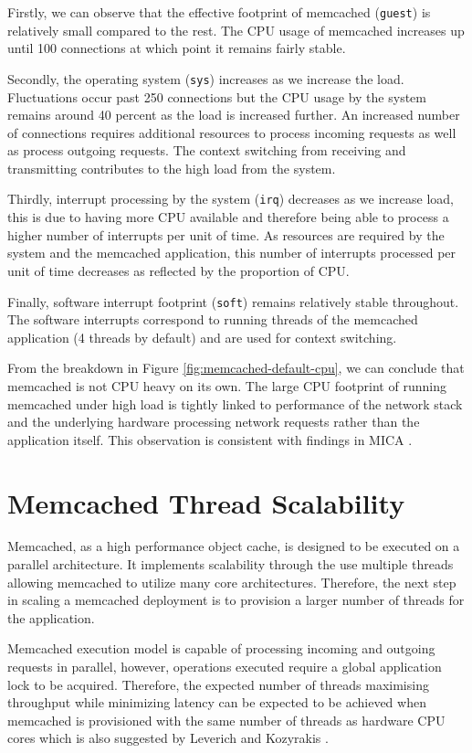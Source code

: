 Firstly, we can observe that the effective footprint of memcached (\texttt{guest}) is relatively small compared to the rest. The CPU usage of memcached increases up until 100 connections at which point it remains fairly stable.

Secondly, the operating system (\texttt{sys}) increases as we increase the load. Fluctuations occur past 250 connections but the CPU usage by the system remains around 40 percent as the load is increased further. An increased number of connections requires additional resources to process incoming requests as well as process outgoing requests. The context switching from receiving and transmitting contributes to the high load from the system.

Thirdly, interrupt processing by the system (\texttt{irq}) decreases as we increase load, this is due to having more CPU available and therefore being able to process a higher number of interrupts per unit of time. As resources are required by the system and the memcached application, this number of interrupts processed per unit of time decreases as reflected by the proportion of CPU.

Finally, software interrupt footprint (\texttt{soft}) remains relatively stable throughout. The software interrupts correspond to running threads of the memcached application (4 threads by default) and are used for context switching.

From the breakdown in Figure \ref{fig:memcached-default-cpu}, we can conclude that memcached is not CPU heavy on its own. The large CPU footprint of running memcached under high load is tightly linked to performance of the network stack and the underlying hardware processing network requests rather than the application itself. This observation is consistent with findings in MICA \cite{lim2014mica}.


\section{Memcached Thread Scalability}
Memcached, as a high performance object cache, is designed to be executed on a parallel architecture. It implements scalability through the use multiple threads allowing memcached to utilize many core architectures. Therefore, the next step in scaling a memcached deployment is to provision a larger number of threads for the application.

Memcached execution model is capable of processing incoming and outgoing requests in parallel, however, operations executed require a global application lock to be acquired. Therefore, the expected number of threads maximising throughput while minimizing latency can be expected to be achieved when memcached is provisioned with the same number of threads as hardware CPU cores which is also suggested by Leverich and Kozyrakis \cite{leverich2014reconciling}.

